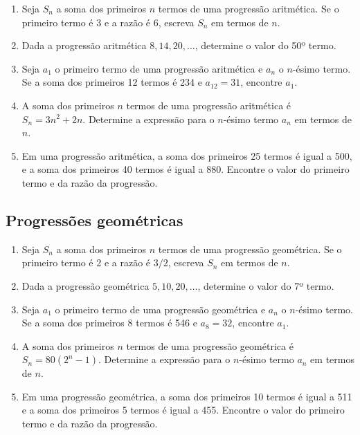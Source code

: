 \documentclass{article}
\begin{document}
\begin{enumerate}

    \item  Seja \(S_n\) a soma dos primeiros \(n\) termos de uma progressão aritmética. Se o primeiro termo é 3 e a razão é 6, escreva \(S_n\) em termos de \(n\).
    
    \item  Dada a progressão aritmética \(8, 14, 20, \ldots\), determine o valor do 50º termo.
    
    \item  Seja \(a_1\) o primeiro termo de uma progressão aritmética e \(a_n\) o \(n\)-ésimo termo. Se a soma dos primeiros 12 termos é 234 e \(a_{12} = 31\), encontre \(a_1\).
    
    \item  A soma dos primeiros \(n\) termos de uma progressão aritmética é \(S_n = 3n^2 + 2n\). Determine a expressão para o \(n\)-ésimo termo \(a_n\) em termos de \(n\).
    
    \item  Em uma progressão aritmética, a soma dos primeiros 25 termos é igual a 500, e a soma dos primeiros 40 termos é igual a 880. Encontre o valor do primeiro termo e da razão da progressão.
    
\end{enumerate}

\subsection{Progressões geométricas}

\begin{enumerate}
    \item Seja \(S_n\) a soma dos primeiros \(n\) termos de uma progressão geométrica. Se o primeiro termo é 2 e a razão é \(3/2\), escreva \(S_n\) em termos de \(n\).
    
    \item  Dada a progressão geométrica \(5, 10, 20, \ldots\), determine o valor do 7º termo.
    
    \item  Seja \(a_1\) o primeiro termo de uma progressão geométrica e \(a_n\) o \(n\)-ésimo termo. Se a soma dos primeiros 8 termos é 546 e \(a_{8} = 32\), encontre \(a_1\).
    
    \item  A soma dos primeiros \(n\) termos de uma progressão geométrica é \(S_n = 80(2^n - 1)\). Determine a expressão para o \(n\)-ésimo termo \(a_n\) em termos de \(n\).
    
    \item  Em uma progressão geométrica, a soma dos primeiros 10 termos é igual a 511 e a soma dos primeiros 5 termos é igual a 455. Encontre o valor do primeiro termo e da razão da progressão.
    
\end{enumerate}


%
%
\end{document}
